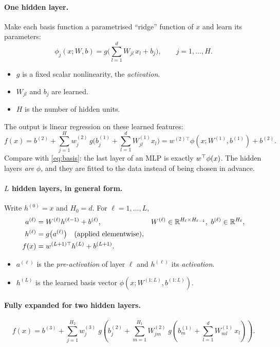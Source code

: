 \paragraph{One hidden layer.} Make each basis function a parametrised ``ridge'' function of $x$ and learn its parameters:
\begin{equation}
\phi_j(x;W,b)=g\Big(\sum_{l=1}^d W_{jl}\,x_l + b_j\Big),\qquad j=1,\dots,H.
\end{equation}
\begin{itemize}
  \item $g$ is a fixed scalar nonlinearity, the \emph{activation}.
  \item $W_{jl}$ and $b_j$ are learned.
  \item $H$ is the number of hidden units.
\end{itemize}
The output is linear regression on these learned features:
\begin{equation}\label{eq:mlp1}
f(x)=b^{(2)}+\sum_{j=1}^{H} w^{(2)}_j\,g\Big(b^{(1)}_j+\sum_{l=1}^d W^{(1)}_{jl}x_l\Big)=w^{(2)\top}\phi(x;W^{(1)},b^{(1)})+b^{(2)}.
\end{equation}
Compare with \eqref{eq:basis}: the last layer of an MLP is exactly $w^{\top}\phi(x)$. The hidden layers \emph{are} $\phi$, and they are fitted to the data instead of being chosen in advance.

\paragraph{$L$ hidden layers, in general form.} Write $h^{(0)}=x$ and $H_0=d$. For $\ell=1,\dots,L$,
\begin{align}
a^{(\ell)} &= W^{(\ell)}h^{(\ell-1)}+b^{(\ell)}, & W^{(\ell)}&\in\R^{H_\ell\times H_{\ell-1}},\ b^{(\ell)}\in\R^{H_\ell},\label{eq:pre}\\
h^{(\ell)} &= g\big(a^{(\ell)}\big)\quad\text{(applied elementwise)},\label{eq:post}\\
f(x) &= w^{(L+1)\top}h^{(L)}+b^{(L+1)}.\label{eq:out}
\end{align}
\begin{itemize}
  \item $a^{(\ell)}$ is the \emph{pre-activation} of layer $\ell$ and $h^{(\ell)}$ its \emph{activation}.
  \item $h^{(L)}$ is the learned basis vector $\phi(x;W^{(1:L)},b^{(1:L)})$.
\end{itemize}

\paragraph{Fully expanded for two hidden layers.}
\begin{equation}\label{eq:mlp2}
f(x)=b^{(3)}+\sum_{j=1}^{H_2}w^{(3)}_j\;g\!\left(b^{(2)}_j+\sum_{m=1}^{H_1}W^{(2)}_{jm}\;g\!\left(b^{(1)}_m+\sum_{l=1}^{d}W^{(1)}_{ml}\,x_l\right)\right).
\end{equation}

